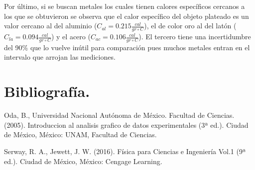 \documentclass[a4paper]{article}
\begin{document}
Por último, si se buscan metales los cuales tienen calores específicos cercanos a los que se obtuvieron se observa que el calor específico del objeto plateado es un valor cercano al del aluminio ($C_{al} = 0.215 \frac{cal}{gr{\circ}C}$), el de color oro al del latón ($C_{la} = 0.094 \frac{cal}{gr{\circ}C}$) y el acero ($C_{ac} = 0.106 \frac{cal}{gr{\circ}C}$). El tercero tiene una incertidumbre del 90\% que lo vuelve inútil para comparación pues muchos metales entran en el intervalo que arrojan las mediciones.

\section{Bibliografía.}

    Oda, B.,  Universidad Nacional Autónoma de México. Facultad de Ciencias. (2005). Introduccion al analisis grafico de datos experimentales (3ª ed.). Ciudad de México, México: UNAM, Facultad de Ciencias.
    
    Serway, R. A.,  Jewett, J. W. (2016). Física para Ciencias e Ingeniería Vol.1 (9ª ed.). Ciudad de México, México: Cengage Learning.
    
\end{document}
